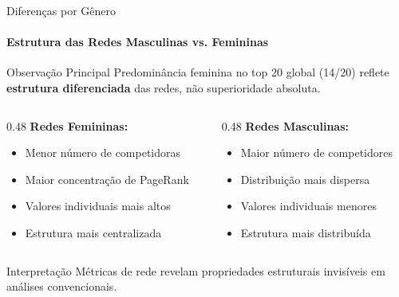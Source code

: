 \begin{frame}{Diferenças por Gênero}
    \framesubtitle{Estrutura das Redes Masculinas vs. Femininas}
    \begin{block}{Observação Principal}
        Predominância feminina no top 20 global (14/20) reflete \textbf{estrutura diferenciada} das redes, não superioridade absoluta.
    \end{block}

    \begin{columns}[T]
        \begin{column}{0.48\textwidth}
            \textbf{Redes Femininas:}
            \begin{itemize}
                \item Menor número de competidoras
                \item Maior concentração de PageRank
                \item Valores individuais mais altos
                \item Estrutura mais centralizada
            \end{itemize}
        \end{column}
        \begin{column}{0.48\textwidth}
            \textbf{Redes Masculinas:}
            \begin{itemize}
                \item Maior número de competidores
                \item Distribuição mais dispersa
                \item Valores individuais menores
                \item Estrutura mais distribuída
            \end{itemize}
        \end{column}
    \end{columns}

    \vspace{0.3cm}
    \begin{alertblock}{Interpretação}
        Métricas de rede revelam propriedades estruturais invisíveis em análises convencionais.
    \end{alertblock}
\end{frame}

